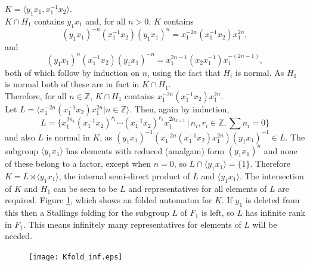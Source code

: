 \documentclass[a4paper,12pt]{article}
\numberwithin{equation}{section}
\numberwithin{figure}{section}
\newcommand{\ZZ}{\ensuremath{\mathbb{Z}}}
\newcommand{\la}{\langle}
\newcommand{\ra}{\rangle}
\begin{document}
\par\noindent $K=\la y_1x_1,x_1^{-1}x_2\ra$. \\[1em]
$K\cap H_1$ contains $y_1x_1$ and, for all $n>0$, $K$ contains
\[(y_1x_1)^{-n}(x_1^{-1}x_2)(y_1x_1)^{n}=x_1^{-2n}(x_1^{-1}x_2) x_1^{2n},\]
and 
\[(y_1x_1)^{n}(x_1^{-1}x_2)(y_1x_1)^{-n}=x_1^{2n-1}(x_2x_1^{-1}) x_1^{-(2n-1)},\]
both of which follow by induction on $n$, using the fact that $H_i$ is normal. 
As $H_1$ is normal both of these are in fact in $K\cap H_1$. \\[1em]
Therefore, for all $n\in \ZZ$, $K\cap H_1$ contains $x_1^{-2n}(x_1^{-1}x_2) x_1^{2n}$. \\[1em]
Let $L=\la x_1^{-2n}(x_1^{-1}x_2) x_1^{2n}|n\in \ZZ\ra$. Then, again by induction, 
\[L=\{x_1^{2n_1}(x_1^{-1}x_2)^{r_1}\cdots (x_1^{-1}x_2)^{r_k}x_1^{2n_{k+1}}\,|\,n_i,r_i\in\ZZ, \sum n_i=0\}\]
and also $L$ is normal in $K$, as $(y_1x_1)^{-1}(x_1^{-2n}(x_1^{-1}x_2) x_1^{2n})(y_1x_1)^{-1}\in L$.  
The subgroup $\la y_1x_1\ra$ has elements with reduced (amalgam) form $(y_1x_1)^n$ and none 
of these belong to a factor, except when $n=0$, so $L\cap \la y_1x_1\ra=\{1\}$. Therefore
$K=L\rtimes \la y_1x_1\ra$, the internal semi-direct product of $L$ and $\la y_1x_1\ra$.
The intersection of $K$ and $H_1$ can be seen to be $L$ and  representatives for all 
elements of $L$ are required. 
Figure \ref{fig:Kfold_inf}, which shows an folded automaton for $K$. If $y_1$ is deleted from
this then a  Stallings folding for the subgroup $L$ of $F_1$ is left, so $L$ has infinite
rank in $F_1$. This means infinitely many representatives for elements of $L$ will 
be needed. 
\begin{figure}
\begin{center}
\texttt{[image: Kfold\_inf.eps]}
\caption{}\label{fig:Kfold_inf}
\end{center}
\end{figure}
%
%
\end{document}
